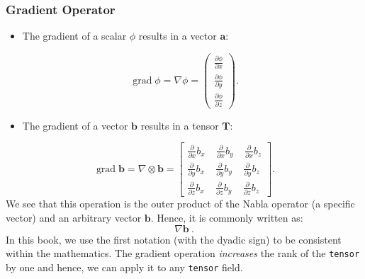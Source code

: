 \documentclass[MathematicsNumericsDerivationsAndOpenFOAM.tex]{subfiles}
\begin{document}
\subsubsection{Gradient Operator}
%
%
\begin{itemize}
    \item The gradient of a scalar $\phi$ results in a vector $\textbf{a}$:
\end{itemize}
%
%
\begin{equation}
 \operatorname{grad}\phi = \nabla \phi
=
  \left(
  \begin{matrix}
    \frac{\partial \phi}{\partial x} \\
    \frac{\partial \phi}{\partial y} \\
    \frac{\partial \phi}{\partial z}
  \end{matrix}
  \right) .
  \label{EQUATION::gradientScalar}
\end{equation}
%
%
\begin{itemize}
    \item The gradient of a vector $\textbf{b}$ results in a tensor $\textbf{T}$:
\end{itemize}
%
%
\begin{equation}
 \operatorname{grad}\textbf{b} = \nabla \otimes \textbf{b}
=
  \left[
  \begin{matrix}
   \frac{\partial}{\partial x}b_x ~ ~ ~ ~ ~ \frac{\partial}{\partial x} b_y ~ ~ ~ ~ ~ \frac{\partial}{\partial x} b_z \\
   \frac{\partial}{\partial y}b_x ~ ~ ~ ~ ~ \frac{\partial}{\partial y} b_y ~ ~ ~ ~ ~ \frac{\partial}{\partial y} b_z \\
   \frac{\partial}{\partial z}b_x ~ ~ ~ ~ ~ \frac{\partial}{\partial z} b_y ~ ~ ~ ~ ~ \frac{\partial}{\partial z} b_z
  \end{matrix}
  \right] .
   \label{EQUATION::gradientVector}
\end{equation}
%
%
	We see that this operation is the outer product of the Nabla operator
    (a specific vector) and an arbitrary vector $\textbf{b}$. Hence, it is
    commonly written as:
%
%
\begin{equation}
  \nabla \textbf{b} ~.
\end{equation}
%
%
    In this book, we use the first notation (with the dyadic sign) to be
    consistent within the mathematics. The gradient operation \textit{increases}
    the rank of the \texttt{tensor} by one and hence, we can apply it to any
    \texttt{tensor} field.
%
%
%
%
\end{document}
